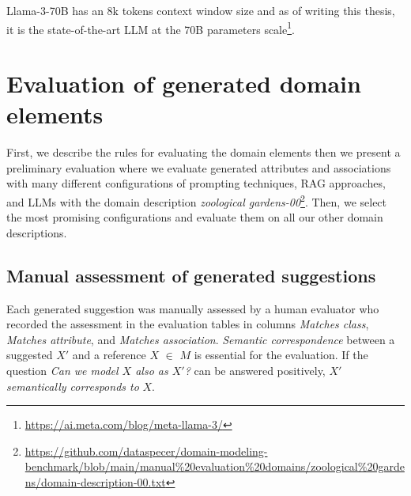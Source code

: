 Llama-3-70B has an 8k tokens context window size and as of writing this thesis, it is the state-of-the-art LLM at the 70B parameters scale\footnote{\url{https://ai.meta.com/blog/meta-llama-3/}}.


%


\section{Evaluation of generated domain elements}

First, we describe the rules for evaluating the domain elements then we present a preliminary evaluation where we evaluate generated attributes and associations with many different configurations of prompting techniques, RAG approaches, and LLMs with the domain description \textit{zoological gardens-00}\footnote{\url{https://github.com/dataspecer/domain-modeling-benchmark/blob/main/manual\%20evaluation\%20domains/zoological\%20gardens/domain-description-00.txt}}. Then, we select the most promising configurations and evaluate them on all our other domain descriptions.


\subsection{Manual assessment of generated suggestions}

Each generated suggestion was manually assessed by a human evaluator who recorded the assessment in the evaluation tables in columns \emph{Matches class}, \emph{Matches attribute}, and \emph{Matches association}.
\emph{Semantic correspondence} between a suggested $X'$ and a reference $X$ $\in$ $M$ is essential for the evaluation.
If the question \emph{Can we model $X$ also as $X'$?} can be answered positively, $X'$ \emph{semantically corresponds to} $X$.

